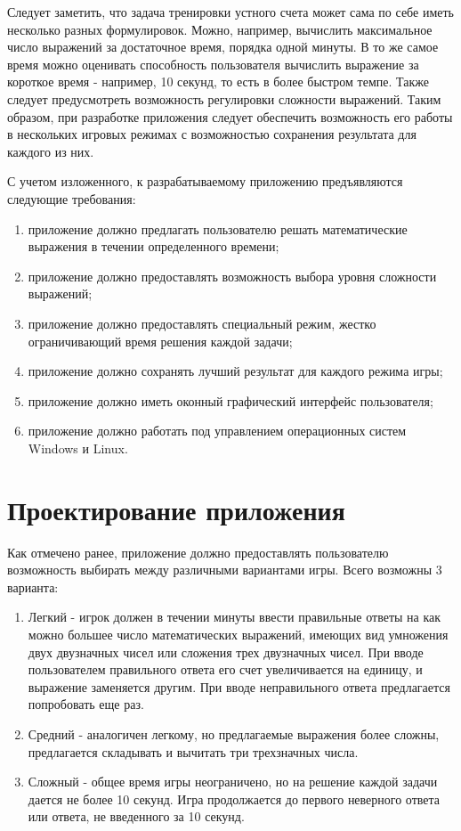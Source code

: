 \documentclass[a4paper,12pt]{article}
\begin{document}
Следует заметить, что задача тренировки устного счета может сама по себе
иметь несколько разных формулировок. Можно, например, вычислить максимальное
число выражений за достаточное время, порядка одной минуты. В то же самое
время можно оценивать способность пользователя вычислить выражение за
короткое время - например, 10 секунд, то есть в более быстром темпе. Также
следует предусмотреть возможность регулировки сложности выражений. Таким образом,
при разработке приложения следует обеспечить возможность его работы в нескольких
игровых режимах с возможностью сохранения результата для каждого из них.

С учетом изложенного, к разрабатываемому приложению предъявляются следующие требования:

\begin{enumerate}
\item	приложение должно предлагать пользователю решать математические выражения
	в течении определенного времени;
\item	приложение должно предоставлять возможность выбора уровня сложности выражений;
\item	приложение должно предоставлять специальный режим, жестко ограничивающий
	время решения каждой задачи;
\item	приложение должно сохранять лучший результат для каждого режима игры;
\item	приложение должно иметь оконный графический интерфейс пользователя;
\item	приложение должно работать под управлением операционных систем Windows и Linux.
\end{enumerate}
 

\newpage
\section{Проектирование приложения}

Как отмечено ранее, приложение должно предоставлять пользователю возможность выбирать
между различными вариантами игры. Всего возможны 3 варианта:

\begin{enumerate}
\item	Легкий - игрок должен в течении минуты ввести правильные ответы на как можно
	большее число математических выражений, имеющих вид умножения двух двузначных
	чисел или сложения трех двузначных чисел. При вводе пользователем правильного
	ответа его счет увеличивается на единицу, и выражение заменяется другим. При
	вводе неправильного ответа предлагается попробовать еще раз.
\item	Средний - аналогичен легкому, но предлагаемые выражения более сложны, предлагается
	складывать и вычитать три трехзначных числа.
\item	Сложный - общее время игры неограничено, но на решение каждой задачи дается
	не более 10 секунд. Игра продолжается до первого неверного ответа или ответа,
	не введенного за 10 секунд.
\end{enumerate}
\end{document}
